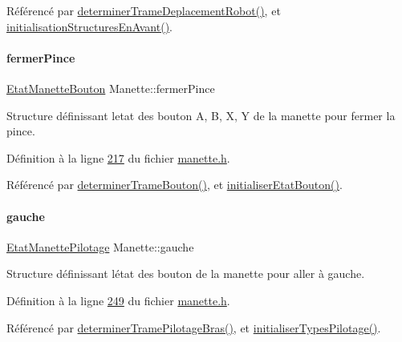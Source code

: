 Référencé par \hyperlink{manette_8cpp_source_l00341}{determiner\+Trame\+Deplacement\+Robot()}, et \hyperlink{manette_8cpp_source_l00103}{initialisation\+Structures\+En\+Avant()}.

\mbox{\label{class_manette_a32adcccdddf35a04970b8b3b12462c00}} 
\paragraph{\texorpdfstring{fermer\+Pince}{fermerPince}}
{\footnotesize\ttfamily \hyperlink{struct_etat_manette_bouton}{Etat\+Manette\+Bouton} Manette\+::fermer\+Pince\hspace{0.3cm}{\ttfamily [private]}}



Structure définissant l\textquotesingle{}etat des bouton A, B, X, Y de la manette pour fermer la pince. 



Définition à la ligne \hyperlink{manette_8h_source_l00217}{217} du fichier \hyperlink{manette_8h_source}{manette.\+h}.



Référencé par \hyperlink{manette_8cpp_source_l00393}{determiner\+Trame\+Bouton()}, et \hyperlink{manette_8cpp_source_l00313}{initialiser\+Etat\+Bouton()}.

\mbox{\label{class_manette_acc72f831540b93ac3a265d35d005c4fa}} 
\paragraph{\texorpdfstring{gauche}{gauche}}
{\footnotesize\ttfamily \hyperlink{struct_etat_manette_pilotage}{Etat\+Manette\+Pilotage} Manette\+::gauche\hspace{0.3cm}{\ttfamily [private]}}



Structure définissant l\textquotesingle{}état des bouton de la manette pour aller à gauche. 



Définition à la ligne \hyperlink{manette_8h_source_l00249}{249} du fichier \hyperlink{manette_8h_source}{manette.\+h}.



Référencé par \hyperlink{manette_8cpp_source_l00375}{determiner\+Trame\+Pilotage\+Bras()}, et \hyperlink{manette_8cpp_source_l00040}{initialiser\+Types\+Pilotage()}.

